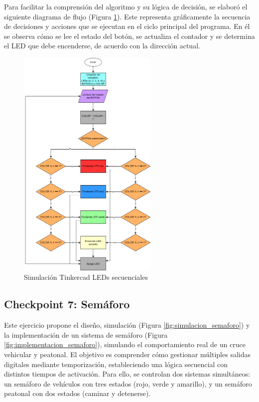 \documentclass{article}
\begin{document}
Para facilitar la comprensión del algoritmo y su lógica de decisión, se elaboró el siguiente diagrama de flujo (Figura \ref{fig:leds_secuenciales_flowchart}). Este representa gr\'aficamente la secuencia de decisiones y acciones que se ejecutan en el ciclo principal del programa. En él se observa cómo se lee el estado del botón, se actualiza el contador y se determina el LED que debe encenderse, de acuerdo con la dirección actual.

\begin{figure}[H]
    \centering
    \includegraphics[width=0.6\textwidth]{./img/ckpt_6_1.png}
    \caption{Simulación Tinkercad LEDs secuenciales}
    \label{fig:leds_secuenciales_flowchart}
\end{figure}

\subsection{Checkpoint 7: Sem\'aforo}

Este ejercicio propone el diseño, simulación (Figura \ref{fig:simulacion_semaforo}) y la implementación de un sistema de semáforo (Figura \ref{fig:implementacion_semaforo}), simulando el comportamiento real de un cruce vehicular y peatonal. El objetivo es comprender cómo gestionar múltiples salidas digitales mediante temporización, estableciendo una lógica secuencial con distintos tiempos de activación. Para ello, se controlan dos sistemas simultáneos: un semáforo de vehículos con tres estados (rojo, verde y amarillo), y un semáforo peatonal con dos estados (caminar y detenerse).
\end{document}
